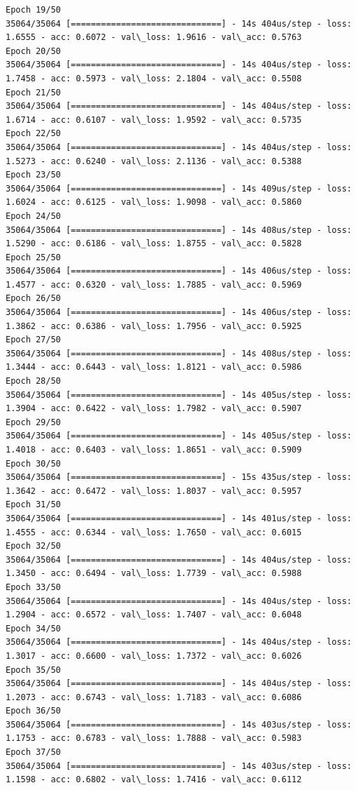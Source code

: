 \documentclass[11pt]{article}
\begin{document}
\begin{Verbatim}[commandchars=\\\{\}]
Epoch 19/50
35064/35064 [==============================] - 14s 404us/step - loss: 1.6555 - acc: 0.6072 - val\_loss: 1.9616 - val\_acc: 0.5763
Epoch 20/50
35064/35064 [==============================] - 14s 404us/step - loss: 1.7458 - acc: 0.5973 - val\_loss: 2.1804 - val\_acc: 0.5508
Epoch 21/50
35064/35064 [==============================] - 14s 404us/step - loss: 1.6714 - acc: 0.6107 - val\_loss: 1.9592 - val\_acc: 0.5735
Epoch 22/50
35064/35064 [==============================] - 14s 404us/step - loss: 1.5273 - acc: 0.6240 - val\_loss: 2.1136 - val\_acc: 0.5388
Epoch 23/50
35064/35064 [==============================] - 14s 409us/step - loss: 1.6024 - acc: 0.6125 - val\_loss: 1.9098 - val\_acc: 0.5860
Epoch 24/50
35064/35064 [==============================] - 14s 408us/step - loss: 1.5290 - acc: 0.6186 - val\_loss: 1.8755 - val\_acc: 0.5828
Epoch 25/50
35064/35064 [==============================] - 14s 406us/step - loss: 1.4577 - acc: 0.6320 - val\_loss: 1.7885 - val\_acc: 0.5969
Epoch 26/50
35064/35064 [==============================] - 14s 406us/step - loss: 1.3862 - acc: 0.6386 - val\_loss: 1.7956 - val\_acc: 0.5925
Epoch 27/50
35064/35064 [==============================] - 14s 408us/step - loss: 1.3444 - acc: 0.6443 - val\_loss: 1.8121 - val\_acc: 0.5986
Epoch 28/50
35064/35064 [==============================] - 14s 405us/step - loss: 1.3904 - acc: 0.6422 - val\_loss: 1.7982 - val\_acc: 0.5907
Epoch 29/50
35064/35064 [==============================] - 14s 405us/step - loss: 1.4018 - acc: 0.6403 - val\_loss: 1.8651 - val\_acc: 0.5909
Epoch 30/50
35064/35064 [==============================] - 15s 435us/step - loss: 1.3642 - acc: 0.6472 - val\_loss: 1.8037 - val\_acc: 0.5957
Epoch 31/50
35064/35064 [==============================] - 14s 401us/step - loss: 1.4555 - acc: 0.6344 - val\_loss: 1.7650 - val\_acc: 0.6015
Epoch 32/50
35064/35064 [==============================] - 14s 404us/step - loss: 1.3450 - acc: 0.6494 - val\_loss: 1.7739 - val\_acc: 0.5988
Epoch 33/50
35064/35064 [==============================] - 14s 404us/step - loss: 1.2904 - acc: 0.6572 - val\_loss: 1.7407 - val\_acc: 0.6048
Epoch 34/50
35064/35064 [==============================] - 14s 404us/step - loss: 1.3017 - acc: 0.6600 - val\_loss: 1.7372 - val\_acc: 0.6026
Epoch 35/50
35064/35064 [==============================] - 14s 404us/step - loss: 1.2073 - acc: 0.6743 - val\_loss: 1.7183 - val\_acc: 0.6086
Epoch 36/50
35064/35064 [==============================] - 14s 403us/step - loss: 1.1753 - acc: 0.6783 - val\_loss: 1.7888 - val\_acc: 0.5983
Epoch 37/50
35064/35064 [==============================] - 14s 403us/step - loss: 1.1598 - acc: 0.6802 - val\_loss: 1.7416 - val\_acc: 0.6112

\end{Verbatim}
\end{document}
